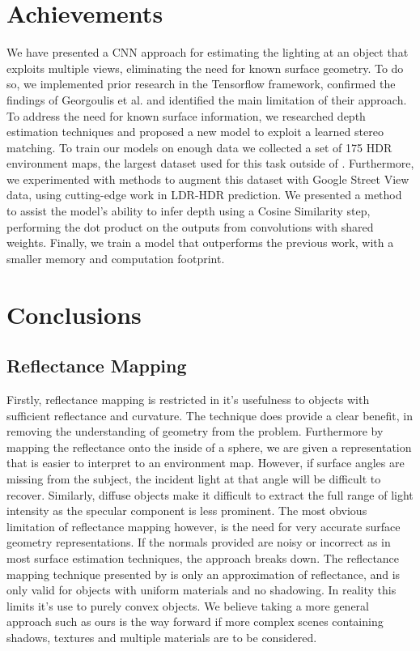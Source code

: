 \documentclass[ %
                    author={Gavin Parker},
                supervisor={Dr. Neill Campbell},
                    degree={MEng},
                     title={Deep Siamese Networks for Illumination Estimation from Stereo Images},
                  subtitle={},
                      type={Research},
                      year={2018} ]{dissertation}
\begin{document}
\section{Achievements}
We have presented a CNN approach for estimating the lighting at an object that exploits multiple views, eliminating the need for known surface geometry. To do so, we implemented prior research in the Tensorflow framework, confirmed the findings of Georgoulis et al. and identified the main limitation of their approach. To address the need for known surface information, we researched depth estimation techniques and proposed a new model to exploit a learned stereo matching. To train our models on enough data we collected a set of 175 HDR environment maps, the largest dataset used for this task outside of \cite{gardner-sigasia-17}. Furthermore, we experimented with methods to augment this dataset with Google Street View data, using cutting-edge work in LDR-HDR prediction. We presented a method to assist the model's ability to infer depth using a Cosine Similarity step, performing the dot product on the outputs from convolutions with shared weights. Finally, we train a model that outperforms the previous work, with a smaller memory and computation footprint.
\section{Conclusions}
\subsection{Reflectance Mapping}
Firstly, reflectance mapping is restricted in it's usefulness to objects with sufficient reflectance and curvature. The technique does provide a clear benefit, in removing the understanding of geometry from the problem. Furthermore by mapping the reflectance onto the inside of a sphere, we are given a representation that is easier to interpret to an environment map. However, if surface angles are missing from the subject, the incident light at that angle will be difficult to recover. Similarly, diffuse objects make it difficult to extract the full range of light intensity as the specular component is less prominent. The most obvious limitation of reflectance mapping however, is the need for very accurate surface geometry representations. If the normals provided are noisy or incorrect as in most surface estimation techniques, the approach breaks down. The reflectance mapping technique presented by \cite{RematasCVPR2016} is only an approximation of reflectance, and is only valid for objects with uniform materials and no shadowing. In reality this limits it's use to purely convex objects. We believe taking a more general approach such as ours is the way forward if more complex scenes containing shadows, textures and multiple materials are to be considered.
\end{document}
